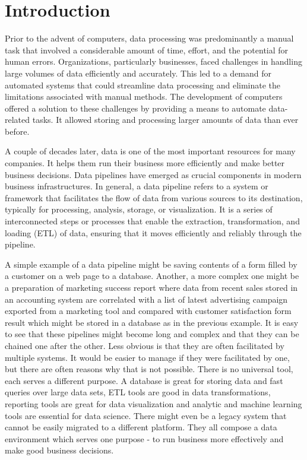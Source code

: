 \chapter{Introduction}

Prior to the advent of computers, data processing was predominantly a manual task that involved a considerable amount of time, effort, and the potential for human errors. Organizations, particularly businesses, faced challenges in handling large volumes of data efficiently and accurately. This led to a demand for automated systems that could streamline data processing and eliminate the limitations associated with manual methods. The development of computers offered a solution to these challenges by providing a means to automate data-related tasks. It allowed storing and processing larger amounts of data than ever before.
\par
A couple of decades later, data is one of the most important resources for many companies. It helps them run their business more efficiently and make better business decisions. Data pipelines have emerged as crucial components in modern business infrastructures. In general, a data pipeline refers to a system or framework that facilitates the flow of data from various sources to its destination, typically for processing, analysis, storage, or visualization. It is a series of interconnected steps or processes that enable the extraction, transformation, and loading (ETL) of data, ensuring that it moves efficiently and reliably through the pipeline.
\par
A simple example of a data pipeline might be saving contents of a form filled by a customer on a web page to a database. Another, a more complex one might be a preparation of marketing success report where data from recent sales stored in an accounting system are correlated with a list of latest advertising campaign exported from a marketing tool and compared with customer satisfaction form result which might be stored in a database as in the previous example. It is easy to see that these pipelines might become long and complex and that they can be chained one after the other. Less obvious is that they are often facilitated by multiple systems. It would be easier to manage if they were facilitated by one, but there are often reasons why that is not possible. There is no universal tool, each serves a different purpose. A database is great for storing data and fast queries over large data sets, ETL tools are good in data transformations, reporting tools are great for data visualization and analytic and machine learning tools are essential for data science. There might even be a legacy system that cannot be easily migrated to a different platform. They all compose a data environment which serves one purpose - to run business more effectively and make good business decisions.
